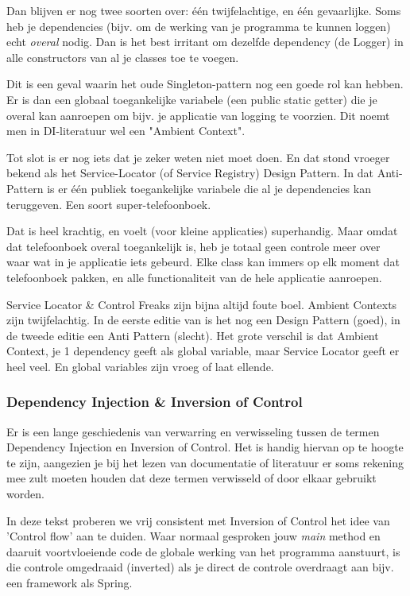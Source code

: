 Dan blijven er nog twee soorten over: één twijfelachtige, en één gevaarlijke. 
Soms heb je dependencies (bijv. om de werking van je programma te kunnen loggen) echt \emph{overal} nodig. 
Dan is het best irritant om dezelfde dependency (de Logger) in alle constructors van al je classes toe te voegen.

Dit is een geval waarin het oude Singleton-pattern nog een goede rol kan hebben. Er is dan een 
globaal toegankelijke variabele (een public static getter) die je overal kan aanroepen om bijv. je 
applicatie van logging te voorzien. Dit noemt men in DI-literatuur wel een "Ambient Context".

Tot slot is er nog iets dat je zeker weten niet moet doen. En dat stond vroeger bekend als het
Service-Locator (of Service Registry) Design Pattern. In dat Anti-Pattern is er één publiek 
toegankelijke variabele die al je dependencies kan teruggeven. Een soort super-telefoonboek.

Dat is heel krachtig, en voelt (voor kleine applicaties) superhandig. Maar omdat dat telefoonboek
overal toegankelijk is, heb je totaal geen controle meer over waar wat in je applicatie iets gebeurd.
Elke class kan immers op elk moment dat telefoonboek pakken, en alle functionaliteit van de hele applicatie 
aanroepen.

Service Locator \& Control Freaks zijn bijna altijd foute boel. Ambient Contexts zijn twijfelachtig. In de eerste
editie van \cite{SeemannDependencyInjection} is het nog een Design Pattern (goed), in de tweede editie een 
Anti Pattern (slecht). Het grote verschil is dat Ambient Context, je 1 dependency geeft als global variable, maar
Service Locator geeft er heel veel. En global variables zijn vroeg of laat ellende.

\subsubsection*{Dependency Injection \& Inversion of Control}

Er is een lange geschiedenis van verwarring en verwisseling tussen de termen Dependency Injection en Inversion of Control.
Het is handig hiervan op te hoogte te zijn, aangezien je bij het lezen van documentatie of literatuur
er soms rekening mee zult moeten houden dat deze termen verwisseld of door elkaar gebruikt worden.

In deze tekst proberen we vrij consistent met Inversion of Control het idee van 'Control flow'
aan te duiden. Waar normaal gesproken jouw \emph{main} method en daaruit voortvloeiende code de 
globale werking van het programma aanstuurt, is die controle omgedraaid (inverted) als je direct
de controle overdraagt aan bijv. een framework als Spring.

